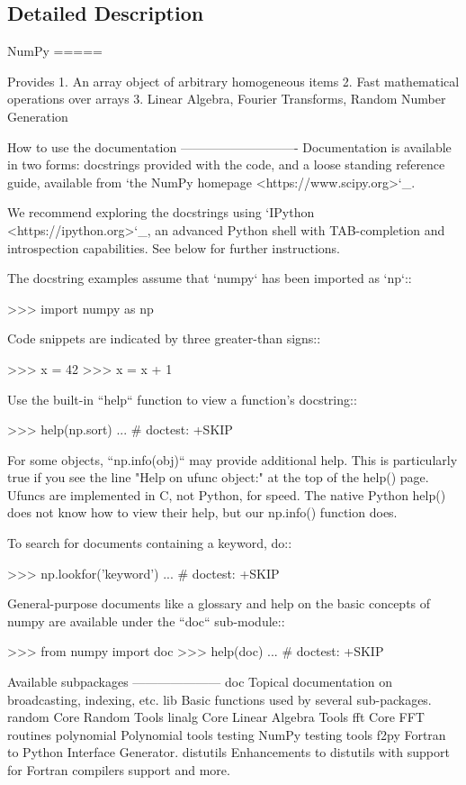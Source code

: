 \subsection{Detailed Description}
\begin{DoxyVerb}NumPy
=====

Provides
  1. An array object of arbitrary homogeneous items
  2. Fast mathematical operations over arrays
  3. Linear Algebra, Fourier Transforms, Random Number Generation

How to use the documentation
----------------------------
Documentation is available in two forms: docstrings provided
with the code, and a loose standing reference guide, available from
`the NumPy homepage <https://www.scipy.org>`_.

We recommend exploring the docstrings using
`IPython <https://ipython.org>`_, an advanced Python shell with
TAB-completion and introspection capabilities.  See below for further
instructions.

The docstring examples assume that `numpy` has been imported as `np`::

  >>> import numpy as np

Code snippets are indicated by three greater-than signs::

  >>> x = 42
  >>> x = x + 1

Use the built-in ``help`` function to view a function's docstring::

  >>> help(np.sort)
  ... # doctest: +SKIP

For some objects, ``np.info(obj)`` may provide additional help.  This is
particularly true if you see the line "Help on ufunc object:" at the top
of the help() page.  Ufuncs are implemented in C, not Python, for speed.
The native Python help() does not know how to view their help, but our
np.info() function does.

To search for documents containing a keyword, do::

  >>> np.lookfor('keyword')
  ... # doctest: +SKIP

General-purpose documents like a glossary and help on the basic concepts
of numpy are available under the ``doc`` sub-module::

  >>> from numpy import doc
  >>> help(doc)
  ... # doctest: +SKIP

Available subpackages
---------------------
doc
Topical documentation on broadcasting, indexing, etc.
lib
Basic functions used by several sub-packages.
random
Core Random Tools
linalg
Core Linear Algebra Tools
fft
Core FFT routines
polynomial
Polynomial tools
testing
NumPy testing tools
f2py
Fortran to Python Interface Generator.
distutils
Enhancements to distutils with support for
Fortran compilers support and more.


\end{DoxyVerb}

